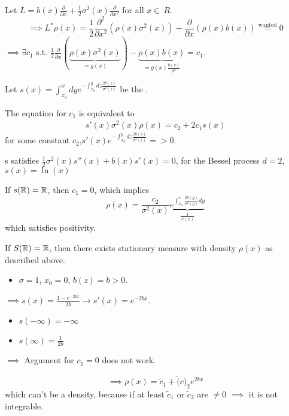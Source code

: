 \begin{example}\label{lem:2.17}
    Let $L=b(x)\frac{\partial }{\partial x}+\frac{1}{2}\sigma^2(x)\frac{\partial}{\partial x^2}$ for all $x\in\ R$.
    \[\implies L^*\rho(x)=\frac{1}{2}\frac{\partial^2}{\partial x^2}(\rho(x)\sigma^2(x))-\frac{\partial}{\partial x}(\rho(x)b(x))\stackrel{\text{wanted}}{=}0\]
    $\implies \exists c_1$ s.t. $\frac{1}{2}\frac{\partial}{\partial x}(\underbrace{\rho(x)\sigma^2(x)}_{=g(x)})-\underbrace{\rho(x)b(x)}_{=g(x)\frac{b(x)}{\sigma^2}}=c_1$.

    Let $s(x)=\int_{x_0}^xdye^{-\int_{x_0}^y dz\frac{2b(z)}{\sigma^2(z)}}$ be the .

    The equation for $c_1$ is equivalent to 
    \begin{align*}
        s'(x)\sigma^2(x)\rho(x)=c_2+2c_1s(x)
    \end{align*}
    for some constant $c_2$,$s'(x)e^{-\int_{x_0}^y dz\frac{2b(z)}{\sigma^2(z)}}=>0$.

    s satisfies $\frac{1}{2}\sigma^2(x)s''(x)+b(x)s'(x)=0$, for the Bessel process $d=2$, $s(x)=\ln(x)$

    If $s(\mathbb{R})=\mathbb{R}$, then $c_1=0$, which implies 
    \[\rho(x)=\frac{c_2}{\sigma^2(x)}\underbrace{e^{\int_{x_0}^x\frac{2b(y)}{\sigma^2(y)}dy}}_{\frac{1}{s'(x)}}\]
    which satisfies positivity.
\end{example}

\begin{lemma}\label{lem:2.18}
    If $S(\mathbb{R})=\mathbb{R}$, then there exists stationary measure with density $\rho(x)$ as described above.
\end{lemma}

\begin{itemize}
    \item $\sigma=1$, $x_0=0$, $b(z)=b>0$.
\end{itemize} 

$\implies s(x)=\frac{1-e^{-2bx}}{2b}\to s'(x)=e^{-2bx}$.

\begin{itemize}
    \item $s(-\infty)=-\infty$
    \item $s(\infty)=\frac{1}{2b}$
\end{itemize}

$\implies $ Argument for $c_1=0$ does not work.

\[\implies \rho(x)=\tilde{c}_1+\tilde(c)_2e^{2bx}\]
which can't be a density, because if at least $\tilde{c}_1$ or $\tilde{c}_2$ are $\neq 0$
$\implies$ it is not integrable.


